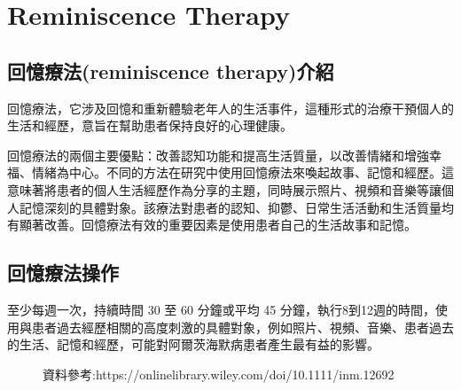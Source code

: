 \chapter{Reminiscence Therapy}
\label{chapter:intro}
\section{回憶療法(reminiscence therapy)介紹}
回憶療法，它涉及回憶和重新體驗老年人的生活事件，這種形式的治療干預個人的生活和經歷，意旨在幫助患者保持良好的心理健康。

回憶療法的兩個主要優點：改善認知功能和提高生活質量，以改善情緒和增強幸福、情緒為中心。不同的方法在研究中使用回憶療法來喚起故事、記憶和經歷。這意味著將患者的個人生活經歷作為分享的主題，同時展示照片、視頻和音樂等讓個人記憶深刻的具體對象。該療法對患者的認知、抑鬱、日常生活活動和生活質量均有顯著改善。回憶療法有效的重要因素是使用患者自己的生活故事和記憶。

\section{回憶療法操作}
至少每週一次，持續時間 30 至 60 分鐘或平均 45 分鐘，執行8到12週的時間，使用與患者過去經歷相關的高度刺激的具體對象，例如照片、視頻、音樂、患者過去的生活、記憶和經歷，可能對阿爾茨海默病患者產生最有益的影響。

\begin{figure}[H]
	\centering
資料參考:https://onlinelibrary.wiley.com/doi/10.1111/inm.12692

\end{figure}